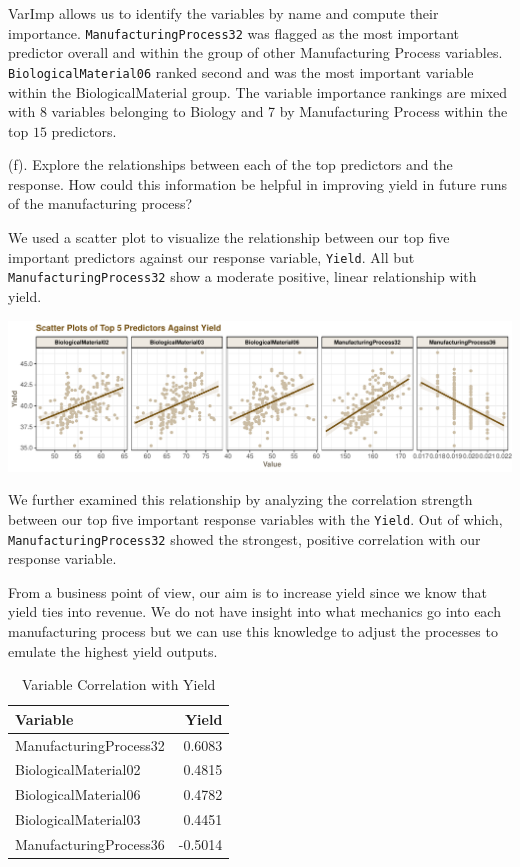 \documentclass[]{report}
\begin{document}
VarImp allows us to identify the variables by name and compute their
importance. \texttt{ManufacturingProcess32} was flagged as the most
important predictor overall and within the group of other Manufacturing
Process variables. \texttt{BiologicalMaterial06} ranked second and was
the most important variable within the BiologicalMaterial group. The
variable importance rankings are mixed with 8 variables belonging to
Biology and 7 by Manufacturing Process within the top \(15\) predictors.

\begin{subquestion}{(f).} Explore the relationships between each of the top predictors and the response. How could this information be helpful in improving yield in future runs of the manufacturing process?
\end{subquestion}

We used a scatter plot to visualize the relationship between our top
five important predictors against our response variable, \texttt{Yield}.
All but \texttt{ManufacturingProcess32} show a moderate positive, linear
relationship with yield.

\includegraphics{Homework-Two_files/figure-latex/kj-6.3f-1-1.pdf}

We further examined this relationship by analyzing the correlation
strength between our top five important response variables with the
\texttt{Yield}. Out of which, \texttt{ManufacturingProcess32} showed the
strongest, positive correlation with our response variable.

From a business point of view, our aim is to increase yield since we
know that yield ties into revenue. We do not have insight into what
mechanics go into each manufacturing process but we can use this
knowledge to adjust the processes to emulate the highest yield outputs.

\begin{table}[H]

\caption{\label{tab:kj-6.3f-2}Variable Correlation with Yield}
\centering
\fontsize{8}{10}\selectfont
\begin{tabular}{lr}
\toprule
\textbf{Variable} & \textbf{Yield}\\
\midrule
\rowcolor{gray!6}  ManufacturingProcess32 & 0.6083\\
BiologicalMaterial02 & 0.4815\\
\rowcolor{gray!6}  BiologicalMaterial06 & 0.4782\\
BiologicalMaterial03 & 0.4451\\
\rowcolor{gray!6}  ManufacturingProcess36 & -0.5014\\
\bottomrule
\end{tabular}
\end{table}
\end{document}
